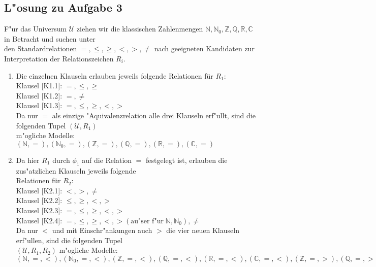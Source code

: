 \documentclass[10pt,oneside,onecolumn,a4paper,german,titlepage]{article}
\begin{document}
\subsection*{L"osung zu Aufgabe 3}
F"ur das Universum $\mathcal{U}$ ziehen wir die klassischen Zahlenmengen $\mathbb{N},
\mathbb{N}_0, \mathbb{Z}, \mathbb{Q}, \mathbb{R}, \mathbb{C}$ in Betracht und suchen
unter\\ den Standardrelationen $=, \leq, \geq, <, >, \neq$ nach geeigneten Kandidaten
zur Interpretation der Relationszeichen $R_i$.
\begin{enumerate}
\item Die einzelnen Klauseln erlauben jeweils folgende Relationen für $R_1$:\\
Klausel [K1.1]: $=, \leq, \geq$\\
Klausel [K1.2]: $=, \neq$\\
Klausel [K1.3]: $=, \leq, \geq, <, >$\\
Da nur $=$ als einzige "Aquivalenzrelation alle drei Klauseln erf"ullt, sind die
folgenden Tupel $(\mathcal{U},R_1)$\\ m"ogliche Modelle:\\
$(\mathbb{N},=), (\mathbb{N}_0,=), (\mathbb{Z},=), (\mathbb{Q},=), (\mathbb{R},=),
(\mathbb{C},=)$
\item Da hier $R_1$ durch $\phi_1$ auf die Relation $=$ festgelegt ist, erlauben die
zus"atzlichen Klauseln jeweils folgende\\ Relationen für $R_2$:\\
Klausel [K2.1]: $<, >, \neq$\\
Klausel [K2.2]: $\leq, \geq, <, >$\\
Klausel [K2.3]: $=, \leq, \geq, <, >$\\
Klausel [K2.4]: $=, \leq, \geq, <, > (\mbox{au"ser f"ur} \; \mathbb{N}, \mathbb{N}_0),
\neq$\\
Da nur $<$ und mit Einschr"ankungen auch $>$ die vier neuen Klauseln erf"ullen, sind
die folgenden Tupel\\ $(\mathcal{U},R_1,R_2)$ m"ogliche Modelle:\\
$(\mathbb{N},=,<), (\mathbb{N}_0,=,<), (\mathbb{Z},=,<), (\mathbb{Q},=,<),
(\mathbb{R},=,<), (\mathbb{C},=,<), (\mathbb{Z},=,>), (\mathbb{Q},=,>),
(\mathbb{R},=,>), (\mathbb{C},=,>)$
\end{enumerate}
\end{document}
